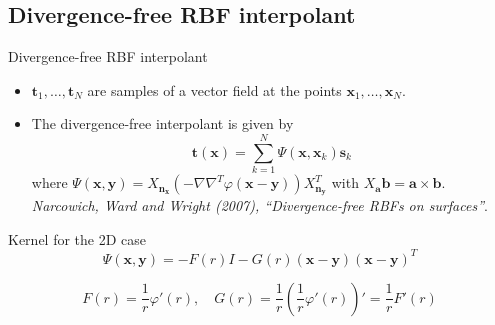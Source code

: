 \documentclass{beamer}
\begin{document}
\subsection{Divergence-free RBF interpolant}
\begin{frame}{Divergence-free RBF interpolant}
  \begin{itemize}
    \item $\mathbf{t}_1,\ldots,\mathbf{t}_N$ are samples of a vector field at
      the points $\mathbf{x}_1,\ldots,\mathbf{x}_N$.
      
    \item The divergence-free interpolant is given by
      \begin{equation*}
	\mathbf{t}(\mathbf{x}) = \sum_{k = 1}^{N}
	{\Psi(\mathbf{x},\mathbf{x}_k)\mathbf{s}_k}
      \end{equation*}
      where $\Psi(\mathbf{x},\mathbf{y}) = X_\mathbf{n_x}
      (-\nabla\nabla^T\varphi(\mathbf{x} - \mathbf{y}))X_{\mathbf{n_y}}^T$ with
      $X_\mathbf{a}\mathbf{b} = \mathbf{a}\times\mathbf{b}$. \emph{Narcowich,
      Ward and Wright (2007), ``Divergence-free RBFs on surfaces''}.
  \end{itemize}
\end{frame}

\begin{frame}{Kernel for the 2D case}
  \begin{equation*}
    \Psi(\mathbf{x},\mathbf{y}) = -F(r)I - G(r)(\mathbf{x} - 
    \mathbf{y})(\mathbf{x} - \mathbf{y})^T
  \end{equation*}

  \begin{equation*}
    F(r) = \frac{1}{r}\varphi'(r), \quad G(r) = 
    \frac{1}{r}\left(\frac{1}{r}\varphi'(r)\right)' = \frac{1}{r}F'(r)
  \end{equation*}
\end{frame}
\end{document}
